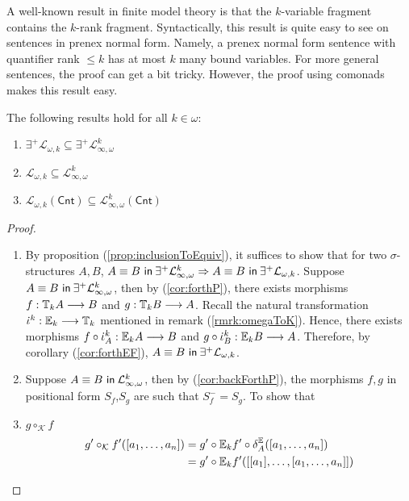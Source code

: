 A well-known result in finite model theory is that the $k$-variable fragment contains the $k$-rank fragment. Syntactically, this result is quite easy to see on sentences in prenex normal form. Namely, a prenex normal form sentence with quantifier rank $\leq k$ has at most $k$ many bound variables. For more general sentences, the proof can get a bit tricky. However, the proof using comonads makes this result easy. 
\begin{prop} The following results hold for all $k \in \omega$:
\begin{enumerate}[label=(\arabic*)]
\item $\exists^{+}\mathcal{L}_{\omega,k} \subseteq \exists^{+}\mathcal{L}^{k}_{\infty,\omega}$
\item $\mathcal{L}_{\omega,k} \subseteq \mathcal{L}^{k}_{\infty,\omega}$
\item $\mathcal{L}_{\omega,k}(\mathsf{Cnt}) \subseteq \mathcal{L}^{k}_{\infty,\omega}(\mathsf{Cnt})$
\end{enumerate}
\begin{proof}
\begin{enumerate}[label=(\arabic*)]
\item By proposition (\ref{prop:inclusionToEquiv}), it suffices to show that for two $\sigma$-structures $A,B$, ${A \equiv B \ \mathsf{in}\: \exists^{+}\mathcal{L}^{k}_{\infty,\omega}} \Rightarrow {A \equiv B \ \mathsf{in}\: \exists^{+}\mathcal{L}_{\omega,k}}$. Suppose ${A \equiv B \ \mathsf{in}\: \exists^{+}\mathcal{L}^{k}_{\infty,\omega}} $, then by (\ref{cor:forthP}), there exists morphisms $f:{\mathbb{T}_{k}A} \longrightarrow B$ and $g:{\mathbb{T}_{k}B} \longrightarrow A$. Recall the natural transformation $\iota^{k}:\efcomonad{k}{} \longrightarrow \pcomonad{k}{}$ mentioned in remark (\ref{rmrk:omegaToK}). Hence, there exists morphisms $f \circ \iota^{k}_{A}:\efcomonad{k}{A} \longrightarrow B$ and $g \circ \iota^{k}_{B}:\efcomonad{k}{B} \longrightarrow A$. Therefore, by corollary (\ref{cor:forthEF}), ${A \equiv B \ \mathsf{in}\: \exists^{+}\mathcal{L}_{\omega,k}}$.
\item Suppose ${A \equiv B \ \mathsf{in}\: \mathcal{L}^{k}_{\infty,\omega}}$, then by (\ref{cor:backForthP}), the morphisms $f,g$ in positional form $S_{f}$,$S_{g}$ are such that $S_{f}^{-} = S_{g}$. To show that  
\item $g \circ_{\mathcal{K}} f$
\begin{align*}
g' \circ_{\mathcal{K}} f'([a_{1},\dots,a_{n}]) &= g' \circ \efcomonad{k}{f'} \circ \delta^{\efcomonad{}{}}_{A}([a_{1},\dots,a_{n}]) \\
&= g' \circ \efcomonad{k}{f'}([[a_{1}],\dots,[a_{1},\dots,a_{n}]]) \\

\end{align*}
\end{enumerate}
\end{proof}
\end{prop}
